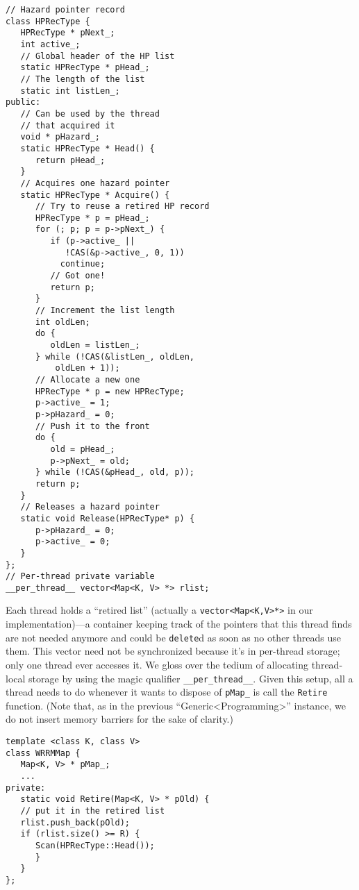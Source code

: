 \documentclass[a4paper,12pt,notitlepage,twoside,openright]{article}
\begin{document}
\begin{verbatim}
// Hazard pointer record
class HPRecType {
   HPRecType * pNext_;
   int active_;
   // Global header of the HP list
   static HPRecType * pHead_;
   // The length of the list
   static int listLen_;
public:
   // Can be used by the thread
   // that acquired it
   void * pHazard_;
   static HPRecType * Head() {
      return pHead_;
   }
   // Acquires one hazard pointer
   static HPRecType * Acquire() {
      // Try to reuse a retired HP record
      HPRecType * p = pHead_;
      for (; p; p = p->pNext_) {
         if (p->active_ ||
            !CAS(&p->active_, 0, 1))
           continue;
         // Got one!
         return p;
      }
      // Increment the list length
      int oldLen;
      do {
         oldLen = listLen_;
      } while (!CAS(&listLen_, oldLen,
          oldLen + 1));
      // Allocate a new one
      HPRecType * p = new HPRecType;
      p->active_ = 1;
      p->pHazard_ = 0;
      // Push it to the front
      do {
         old = pHead_;
         p->pNext_ = old;
      } while (!CAS(&pHead_, old, p));
      return p;
   }
   // Releases a hazard pointer
   static void Release(HPRecType* p) {
      p->pHazard_ = 0;
      p->active_ = 0;
   }
};
// Per-thread private variable
__per_thread__ vector<Map<K, V> *> rlist;
\end{verbatim}

Each thread holds a ``retired list'' (actually a \texttt{vector<Map<K,V>*>} in our implementation)---a container keeping track of the pointers that this thread finds are not needed anymore and could be \texttt{delete}d as soon as no other threads use them. This vector need not be synchronized because it's in per-thread storage; only one thread ever accesses it. We gloss over the tedium of allocating thread-local storage by using the magic qualifier \texttt{\_\_per\_thread\_\_}. Given this setup, all a thread needs to do whenever it wants to dispose of \texttt{pMap\_} is call the \texttt{Retire} function. (Note that, as in the previous ``Generic<Programming>'' instance, we do not insert memory barriers for the sake of clarity.)

\begin{verbatim}
template <class K, class V>
class WRRMMap {
   Map<K, V> * pMap_;
   ...
private:
   static void Retire(Map<K, V> * pOld) {
   // put it in the retired list
   rlist.push_back(pOld);
   if (rlist.size() >= R) {
      Scan(HPRecType::Head());
      }
   }
};
\end{verbatim}
\end{document}
